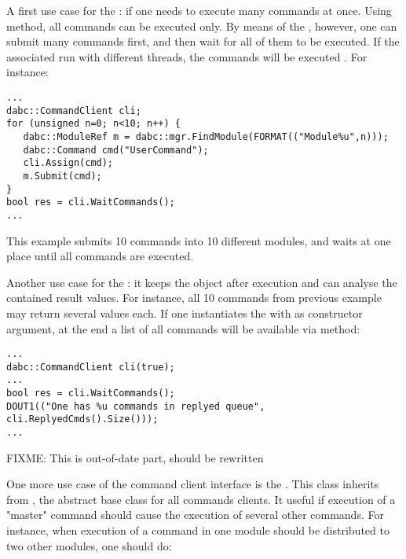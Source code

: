 A first use case for the : if one needs to execute many commands at once.
Using  method, all commands can be  executed  only.
By means of the , however, 
one can  submit many commands first, and then wait for all
of them to be executed.  If the associated  run with 
different threads, the commands will be executed . For instance:

\begin{small}
\begin{verbatim}
...
dabc::CommandClient cli;
for (unsigned n=0; n<10; n++) {
   dabc::ModuleRef m = dabc::mgr.FindModule(FORMAT(("Module%u",n)));
   dabc::Command cmd("UserCommand");
   cli.Assign(cmd);
   m.Submit(cmd);
}
bool res = cli.WaitCommands();
...
\end{verbatim}     
\end{small}
  
This example submits 10 commands into 10 different modules, 
and waits at one place until all commands are executed.

Another use case for the : 
it keeps the  object after execution 
and can analyse the contained result values. 
For instance, all 10 commands from previous example may 
return several values each. If one instantiates 
the  with  as constructor argument,
at the end a list of all commands will be available 
via  method: 
\begin{small}
\begin{verbatim}
...
dabc::CommandClient cli(true);
...
bool res = cli.WaitCommands();
DOUT1(("One has %u commands in replyed queue", cli.ReplyedCmds().Size()));
...
\end{verbatim}     
\end{small}


FIXME: This is out-of-date part, should be rewritten

One more use case of the command client interface is the . 
This class inherits from ,
the abstract base class for all commands clients. 
It useful if execution of a "master" command should cause the execution of several
other commands. For instance, when execution of a command 
in one module should be distributed to two other modules, one should do:

